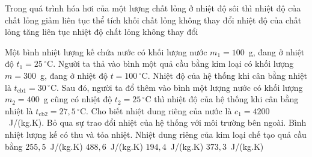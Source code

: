 	\begin{ex}%
		Trong quá trình hóa hơi của một lượng chất lỏng ở nhiệt độ sôi thì
		\choice
		{nhiệt độ của chất lỏng giảm liên tục}
		{thể tích khối chất lỏng không thay đổi}
		{nhiệt độ của chất lỏng tăng liên tục}
		{\True nhiệt độ chất lỏng không thay đổi}
	\end{ex}

	\begin{ex}%
		Một bình nhiệt lượng kế chứa nước có khối lượng nước $m_1=100$~g, đang ở nhiệt độ $t_1=25\,^\circ\text{C}$. Người ta thả vào bình một quả cầu bằng kim loại có khối lượng $m=300$~g, đang ở nhiệt độ $t=100\,^\circ\text{C}$. Nhiệt độ của hệ thống khi cân bằng nhiệt là $t_{\text{cb}1}=30\,^\circ\text{C}$. Sau đó, người ta đổ thêm vào bình một lượng nước có khối lượng $m_2=400$~g cũng có nhiệt độ $t_2=25\,^\circ\text{C}$ thì nhiệt độ của hệ thống khi cân bằng nhiệt là $t_{\text{cb}2}=27{,}5\,^\circ\text{C}$. Cho biết nhiệt dung riêng của nước là $c_1=4200$~J/(kg.K). Bỏ qua sự trao đổi nhiệt của hệ thống với môi trường bên ngoài. Bình nhiệt lượng kế có thu và tỏa nhiệt. Nhiệt dung riêng của kim loại chế tạo quả cầu bằng
		\choice
		{$255{,}5$~J/(kg.K)}
		{$488{,}6$~J/(kg.K)}
		{$194{,}4$~J/(kg.K)}
		{\True $373{,}3$~J/(kg.K)}
	\end{ex}

